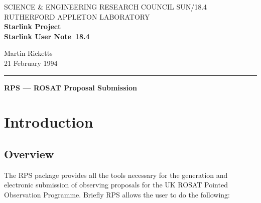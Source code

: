 \pagestyle{myheadings}

\newcommand{\stardoccategory}  {Starlink User Note}
\newcommand{\stardocinitials}  {SUN}
\newcommand{\stardocnumber}    {18.4}
\newcommand{\stardocauthors}   {Martin Ricketts}
\newcommand{\stardocdate}      {21 February 1994}
\newcommand{\stardoctitle}     {RPS --- ROSAT Proposal Submission}

\newcommand{\stardocname}{\stardocinitials /\stardocnumber}
\markright{\stardocname}
\setlength{\textwidth}{160mm}
\setlength{\textheight}{230mm}
\setlength{\topmargin}{-2mm}
\setlength{\oddsidemargin}{0mm}
\setlength{\evensidemargin}{0mm}
\setlength{\parindent}{0mm}
\setlength{\parskip}{\medskipamount}
\setlength{\unitlength}{1mm}


\thispagestyle{empty}
SCIENCE \& ENGINEERING RESEARCH COUNCIL \hfill \stardocname\\
RUTHERFORD APPLETON LABORATORY\\
{\large\bf Starlink Project\\}
{\large\bf \stardoccategory\ \stardocnumber}
\begin{flushright}
\stardocauthors\\
\stardocdate
\end{flushright}
\vspace{-4mm}
\rule{\textwidth}{0.5mm}
\vspace{5mm}
\begin{center}
{\Large\bf \stardoctitle}
\end{center}
\vspace{5mm}

\section{Introduction}

\subsection{Overview}

The RPS package provides all the tools necessary for the generation and
electronic submission of observing proposals for the UK ROSAT Pointed 
Observation Programme. Briefly RPS allows the user to do the following:


